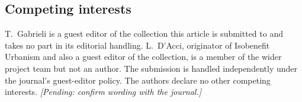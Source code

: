 \documentclass[11pt]{article}
\newcommand{\pending}[1]{\textit{[Pending: #1]}}
\begin{document}
\subsection*{Competing interests}

T.~Gabrieli is a guest editor of the collection this article is
submitted to and takes no part in its editorial handling. L.~D'Acci,
originator of Isobenefit Urbanism and also a guest editor of the
collection, is a member of the wider project team but not an author.
The submission is handled independently under the journal's
guest-editor policy. The authors declare no other competing
interests. \pending{confirm wording with the journal.}

\FloatBarrier


\end{document}
